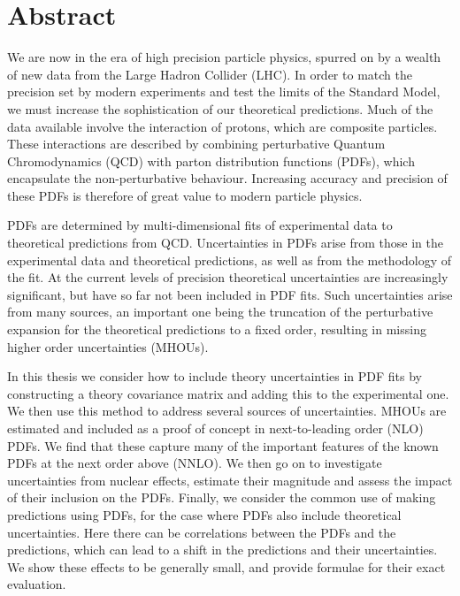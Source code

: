 \chapter{Abstract}

We are now in the era of high precision particle physics, spurred on by a wealth of new data from the Large Hadron Collider (LHC). In order to match the precision set by modern experiments and test the limits of the Standard Model, we must increase the sophistication of our theoretical predictions. Much of the data available involve the interaction of protons, which are composite particles. These interactions are described by combining perturbative Quantum Chromodynamics (QCD) with parton distribution functions (PDFs), which encapsulate the non-perturbative behaviour. Increasing accuracy and precision of these PDFs is therefore of great value to modern particle physics.

PDFs are determined by multi-dimensional fits of experimental data to theoretical predictions from QCD. Uncertainties in PDFs arise from those in the experimental data and theoretical predictions, as well as from the methodology of the fit. At the current levels of precision theoretical uncertainties are increasingly significant, but have so far not been included in PDF fits. Such uncertainties arise from many sources, an important one being the truncation of the perturbative expansion for the theoretical predictions to a fixed order, resulting in missing higher order uncertainties (MHOUs).

In this thesis we consider how to include theory uncertainties in PDF fits by constructing a theory covariance matrix and adding this to the experimental one. We then use this method to address several sources of uncertainties. MHOUs are estimated and included as a proof of concept in next-to-leading order (NLO) PDFs. We find that these capture many of the important features of the known PDFs at the next order above (NNLO). We then go on to investigate uncertainties from nuclear effects, estimate their magnitude and assess the impact of their inclusion on the PDFs. Finally, we consider the common use of making predictions using PDFs, for the case where PDFs also include theoretical uncertainties. Here there can be correlations between the PDFs and the predictions, which can lead to a shift in the predictions and their uncertainties. We show these effects to be generally small, and provide formulae for their exact evaluation.
